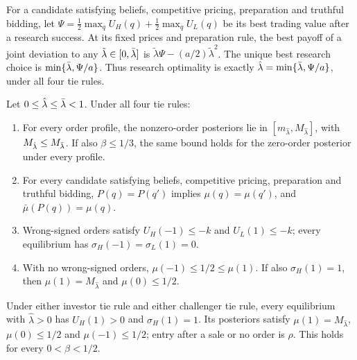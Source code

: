 \begin{lemma}\label{lem:a5-joint}
For a candidate satisfying beliefs, competitive pricing, preparation and truthful bidding, let
\(\Psi=\tfrac12\max_qU_H(q)+\tfrac12\max_qU_L(q)\) be its best trading value after a research success.
At its fixed prices and preparation rule, the best payoff of a joint deviation to any
\(\tilde\lambda\in[0,\bar\lambda]\) is \(\tilde\lambda\Psi-(a/2)\tilde\lambda^2\).
The unique best research choice is \(\min\{\bar\lambda,\Psi/a\}\). Thus research optimality is exactly
\(\hat\lambda=\min\{\bar\lambda,\Psi/a\}\), under all four tie rules.
\end{lemma}

\begin{lemma}\label{lem:a5-bounds}
Let \(0\le\hat\lambda\le\bar\lambda<1\). Under all four tie rules:
\begin{enumerate}[label=(\alph*),leftmargin=2em]
\item For every order profile, the nonzero-order posteriors lie in
\([m_{\hat\lambda},M_{\hat\lambda}]\), with \(M_{\hat\lambda}\le M_{\bar\lambda}\).
If also \(\beta\le1/3\), the same bound holds for the zero-order posterior under every profile.
\item For every candidate satisfying beliefs, competitive pricing, preparation and truthful bidding,
\(P(q)=P(q')\) implies \(\mu(q)=\mu(q')\), and \(\bar\mu(P(q))=\mu(q)\).
\item Wrong-signed orders satisfy \(U_H(-1)\le-k\) and \(U_L(1)\le-k\); every equilibrium has
\(\sigma_H(-1)=\sigma_L(1)=0\).
\item With no wrong-signed orders, \(\mu(-1)\le1/2\le\mu(1)\).
If also \(\sigma_H(1)=1\), then \(\mu(1)=M_{\hat\lambda}\) and \(\mu(0)\le1/2\).
\end{enumerate}
\end{lemma}

\begin{lemma}\label{lem:a5-buy}
Under either investor tie rule and either challenger tie rule, every equilibrium with \(\hat\lambda>0\) has
\(U_H(1)>0\) and \(\sigma_H(1)=1\). Its posteriors satisfy
\(\mu(1)=M_{\hat\lambda}\), \(\mu(0)\le1/2\) and \(\mu(-1)\le1/2\); entry after a sale or no order is
\(\rho\). This holds for every \(0<\beta<1/2\).
\end{lemma}

